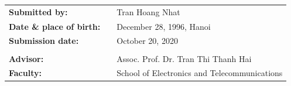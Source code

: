 \vspace{3.0cm}
\begin{center}
\small
\renewcommand{\arraystretch}{1.5} 
\begin{tabular}{lll}
    \textbf{Submitted by:} & & Tran Hoang Nhat\\
    \textbf{Date \& place of birth:} & & December 28, 1996, Hanoi\\
    \textbf{Submission date:} & & October 20, 2020 \\
    & & \\
    \textbf{Advisor:} & & Assoc. Prof. Dr. Tran Thi Thanh Hai \\
    \textbf{Faculty:} & & School of Electronics and Telecommunications \\
\end{tabular}
\end{center}
